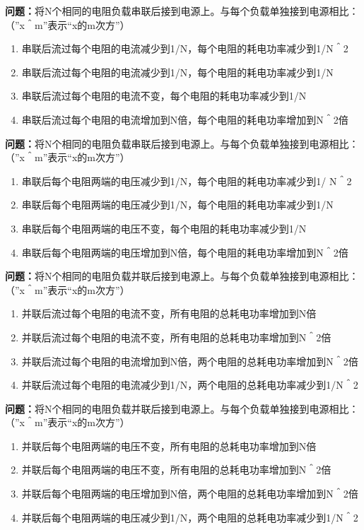 \bigskip


\noindent\textbf{问题：}将N个相同的电阻负载串联后接到电源上。与每个负载单独接到电源相比：（”x＾m”表示“x的m次方”）
\begin{enumerate}[label=\Alph*), leftmargin=3em]
\item 串联后流过每个电阻的电流减少到1/N，每个电阻的耗电功率减少到1/N＾2
\item 串联后流过每个电阻的电流减少到1/N，每个电阻的耗电功率减少到1/N
\item 串联后流过每个电阻的电流不变，每个电阻的耗电功率减少到1/N
\item 串联后流过每个电阻的电流增加到N倍，每个电阻的耗电功率增加到N＾2倍
\end{enumerate}

\bigskip


\noindent\textbf{问题：}将N个相同的电阻负载串联后接到电源上。与每个负载单独接到电源相比：（”x＾m”表示“x的m次方”）
\begin{enumerate}[label=\Alph*), leftmargin=3em]
\item 串联后每个电阻两端的电压减少到1/N，每个电阻的耗电功率减少到1/ N＾2
\item 串联后每个电阻两端的电压减少到1/N，每个电阻的耗电功率减少到1/N
\item 串联后每个电阻两端的电压不变，每个电阻的耗电功率减少到1/N
\item 串联后每个电阻两端的电压增加到N倍，每个电阻的耗电功率增加到N＾2倍
\end{enumerate}

\bigskip


\noindent\textbf{问题：}将N个相同的电阻负载并联后接到电源上。与每个负载单独接到电源相比：（”x＾m”表示“x的m次方”）
\begin{enumerate}[label=\Alph*), leftmargin=3em]
\item 并联后流过每个电阻的电流不变，所有电阻的总耗电功率增加到N倍
\item 并联后流过每个电阻的电流不变，所有电阻的总耗电功率增加到N＾2倍
\item 并联后流过每个电阻的电流增加到N倍，两个电阻的总耗电功率增加到N＾2倍
\item 并联后流过每个电阻的电流减少到1/N，两个电阻的总耗电功率减少到1/N＾2
\end{enumerate}

\bigskip


\noindent\textbf{问题：}将N个相同的电阻负载并联后接到电源上。与每个负载单独接到电源相比：（”x＾m”表示“x的m次方”）
\begin{enumerate}[label=\Alph*), leftmargin=3em]
\item 并联后每个电阻两端的电压不变，所有电阻的总耗电功率增加到N倍
\item 并联后每个电阻两端的电压不变，所有电阻的总耗电功率增加到N＾2倍
\item 并联后每个电阻两端的电压增加到N倍，两个电阻的总耗电功率增加到N＾2倍
\item 并联后每个电阻两端的电压减少到1/N，两个电阻的总耗电功率减少到1/N＾2
\end{enumerate}

